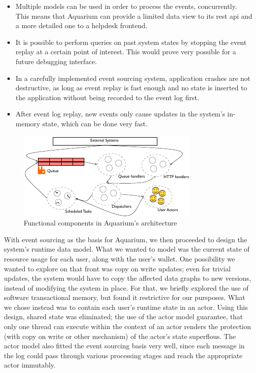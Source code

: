 \begin{itemize}

    \item Multiple models can be used in order to process the events, 
        concurrently. This means that Aquarium can provide a limited
        data view to its {\sc rest api} and a more detailed one to a
        helpdesk frontend.

    \item It is possible to perform queries on past system states by stopping
        the event replay at a certain point of interest. This would prove very
        possible for a future debugging interface.

    \item In a carefully implemented event sourcing system, application crashes 
        are not destructive, as long as event replay is fast enough and no
        state is inserted to the application without being recorded to the event
        log first.

    \item After event log replay, new events only cause updates in the system's
        in-memory state, which can be done very fast.

\end{itemize}

\begin{figure}
    \begin{center}
    \includegraphics[scale=1.5]{arch.pdf}
    \end{center}
\caption{Functional components in Aquarium's architecture} 
\label{fig:arch}
\end{figure}

With event sourcing as the basis for Aquarium, we then proceeded to design the
system's runtime data model. What we wanted to model was the current state of
resource usage for each user, along with the user's wallet. One possibility we
wanted to explore on that front was copy on write updates; even for trivial
updates, the system would have to copy the affected data graphs to new
versions, instead of modifying the system in place. For that, we briefly
explored the use of software transactional memory, but found it restrictive for
our pursposes. What we chose instead was to contain each user's runtime state
in an actor. Using this design, shared state was eliminated; the use of the
actor model guarantee, that only one thread can execute within the context of
an actor renders the protection (with copy on write or other mechanism) of the
actor's state superflous. The actor model also fitted the event sourcing basis
very well, since each message in the log could pass through various processing
stages and reach the appropriate actor immutably.

